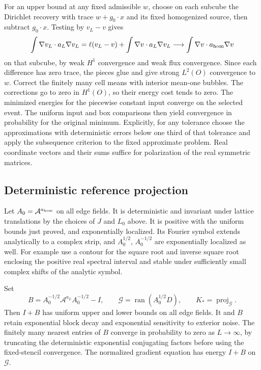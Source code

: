 \documentclass[11pt]{article}
\begin{document}
For an upper bound at any fixed admissible \(w\), choose on each subcube the Dirichlet recovery with trace \(w+g_0\cdot x\) and its fixed homogenized source, then subtract \(g_0\cdot x\). Testing by \(v_L-v\) gives
\[
 \int \nabla v_L\cdot a_L\nabla v_L
   =\ell(v_L-v)+\int \nabla v\cdot a_L\nabla v_L
   \longrightarrow\int \nabla v\cdot a_{\rm hom}\nabla v
\]
on that subcube, by weak \(H^1\) convergence and weak flux convergence. Since each difference has zero trace, the pieces glue and give strong \(L^2(O)\) convergence to \(w\). Correct the finitely many cell means with interior mean-one bubbles. The corrections go to zero in \(H^1(O)\), so their energy cost tends to zero. The minimized energies for the piecewise constant input converge on the selected event. The uniform input and box comparisons then yield convergence in probability for the original minimum. Explicitly, for any tolerance choose the approximations with deterministic errors below one third of that tolerance and apply the subsequence criterion to the fixed approximate problem. Real coordinate vectors and their sums suffice for polarization of the real symmetric matrices.

\subsection{Deterministic reference projection}\label{subsec:reference}

Let \(A_0=\mathcal A^{a_{\rm hom}}\) on all edge fields. It is deterministic and invariant under lattice translations by the choices of \(J\) and \(L_0\) above. It is positive with the uniform bounds just proved, and exponentially localized. Its Fourier symbol extends analytically to a complex strip, and \(A_0^{1/2}\), \(A_0^{-1/2}\) are exponentially localized as well. For example use a contour for the square root and inverse square root enclosing the positive real spectral interval and stable under sufficiently small complex shifts of the analytic symbol.

Set \[
B=A_0^{-1/2}\mathcal A^{a_L}A_0^{-1/2}-I,\qquad
\mathcal G=\operatorname{ran}(A_0^{1/2}D),\qquad
K_*=\operatorname{proj}_{\mathcal G}.
\] Then \(I+B\) has uniform upper and lower bounds on all edge fields. It and \(B\) retain exponential block decay and exponential sensitivity to exterior noise. The finitely many nearest entries of \(B\) converge in probability to zero as \(L\to\infty\), by truncating the deterministic exponential conjugating factors before using the fixed-stencil convergence. The normalized gradient equation has energy \(I+B\) on \(\mathcal G\).
\end{document}
